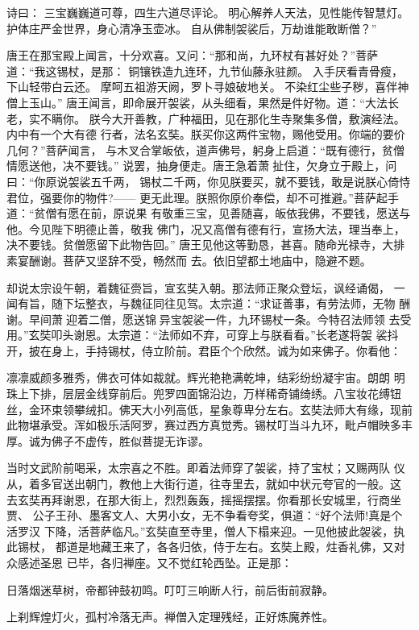 诗曰：
三宝巍巍道可尊，四生六道尽评论。
明心解养人天法，见性能传智慧灯。
护体庄严金世界，身心清净玉壶冰。
自从佛制袈裟后，万劫谁能敢断僧？”

唐王在那宝殿上闻言，十分欢喜。又问：“那和尚，九环杖有甚好处？”菩萨
道：“我这锡杖，是那：
铜镶铁造九连环，九节仙藤永驻颜。
入手厌看青骨瘦，下山轻带白云还。
摩呵五祖游天阙，罗卜寻娘破地关。
不染红尘些子秽，喜伴神僧上玉山。”
唐王闻言，即命展开袈裟，从头细看，果然是件好物。道：“大法长老，实不瞒你。
朕今大开善教，广种福田，见在那化生寺聚集多僧，敷演经法。内中有一个大有德
行者，法名玄奘。朕买你这两件宝物，赐他受用。你端的要价几何？”菩萨闻言，
与木叉合掌皈依，道声佛号，躬身上启道：“既有德行，贫僧情愿送他，决不要钱。”
说罢，抽身便走。唐王急着萧扯住，欠身立于殿上，问曰：“你原说袈裟五千两，
锡杖二千两，你见朕要买，就不要钱，敢是说朕心倚恃君位，强要你的物件?——
更无此理。朕照你原价奉偿，却不可推避。”菩萨起手道：“贫僧有愿在前，原说果
有敬重三宝，见善随喜，皈依我佛，不要钱，愿送与他。今见陛下明德止善，敬我
佛门，况又高僧有德有行，宣扬大法，理当奉上，决不要钱。贫僧愿留下此物告回。”
唐王见他这等勤恳，甚喜。随命光禄寺，大排素宴酬谢。菩萨又坚辞不受，畅然而
去。依旧望都土地庙中，隐避不题。

却说太宗设午朝，着魏征赍旨，宣玄奘入朝。那法师正聚众登坛，讽经诵偈，
一闻有旨，随下坛整衣，与魏征同往见驾。太宗道：“求证善事，有劳法师，无物
酬谢。早间萧迎着二僧，愿送锦异宝袈裟一件，九环锡杖一条。今特召法师领
去受用。”玄奘叩头谢恩。太宗道：“法师如不弃，可穿上与朕看看。”长老遂将袈
裟抖开，披在身上，手持锡杖，侍立阶前。君臣个个欣然。诚为如来佛子。你看他：

凛凛威颜多雅秀，佛衣可体如裁就。辉光艳艳满乾坤，结彩纷纷凝宇宙。朗朗
明珠上下排，层层金线穿前后。兜罗四面锦沿边，万样稀奇铺绮绣。八宝妆花缚钮
丝，金环束领攀绒扣。佛天大小列高低，星象尊卑分左右。玄奘法师大有缘，现前
此物堪承受。浑如极乐活阿罗，赛过西方真觉秀。锡杖叮当斗九环，毗卢帽映多丰
厚。诚为佛子不虚传，胜似菩提无诈谬。

当时文武阶前喝采，太宗喜之不胜。即着法师穿了袈裟，持了宝杖；又赐两队
仪从，着多官送出朝门，教他上大街行道，往寺里去，就如中状元夸官的一般。这
去玄奘再拜谢恩，在那大街上，烈烈轰轰，摇摇摆摆。你看那长安城里，行商坐贾、
公子王孙、墨客文人、大男小女，无不争看夸奖，俱道：“好个法师!真是个活罗汉
下降，活菩萨临凡。”玄奘直至寺里，僧人下榻来迎。一见他披此袈裟，执此锡杖，
都道是地藏王来了，各各归依，侍于左右。玄奘上殿，炷香礼佛，又对众感述圣恩
已毕，各归禅座。又不觉红轮西坠。正是那：

日落烟迷草树，帝都钟鼓初鸣。叮叮三响断人行，前后街前寂静。

上刹辉煌灯火，孤村冷落无声。禅僧入定理残经，正好炼魔养性。

